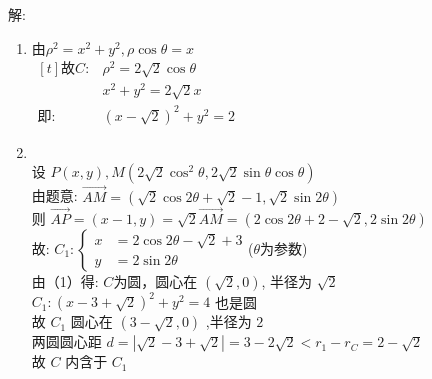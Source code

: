 \documentclass[class=ctexart,crop=false]{standalone}
\begin{document}
解:
\begin{enumerate}[label=(\arabic*)]
	\item
	      由$\rho^2=x^2+y^2,\rho\cos{\theta}=x$\\
	      $\begin{aligned}[t]
			      \text{故}C: & \rho^2=2\sqrt{2}\cos{\theta} \\
			                  & x^2+y^2=2\sqrt{2}x           \\
			      \text{即:}  & (x-\sqrt{2})^2+y^2=2
		      \end{aligned}$
	\item  \quad\\
	      设 $P(x,y),M(2\sqrt{2}\cos^2{\theta},2\sqrt{2}\sin{\theta}\cos{\theta})$\\
	      由题意: $\overrightarrow{AM}=(\sqrt{2}\cos{2\theta}+\sqrt{2}-1,\sqrt{2}\sin{2\theta})$\\
	      则 $\overrightarrow{AP}=(x-1,y)=\sqrt{2}\overrightarrow{AM}=(2\cos{2\theta}+2-\sqrt2,2\sin{2\theta})$\\
	      故: $C_1: \left\{\begin{aligned}
			      x & =2\cos{2\theta}-\sqrt{2}+3 \\
			      y & =2\sin{2\theta}
		      \end{aligned}\right.$($\theta$为参数)\\
	      由（1）得: $C$为圆，圆心在 $(\sqrt{2},0)$, 半径为 $\sqrt{2}$\\
	      $C_1:(x-3+\sqrt{2})^2+y^2=4$ 也是圆\\
	      故 $C_1$ 圆心在 $(3-\sqrt{2},0)$ ,半径为 $2$\\
	      两圆圆心距 $d=|\sqrt{2}-3+\sqrt{2}|=3-2\sqrt{2}<r_1-r_C=2-\sqrt{2}$\\
	      故 $C$ 内含于 $C_1$

\end{enumerate}
\end{document}
